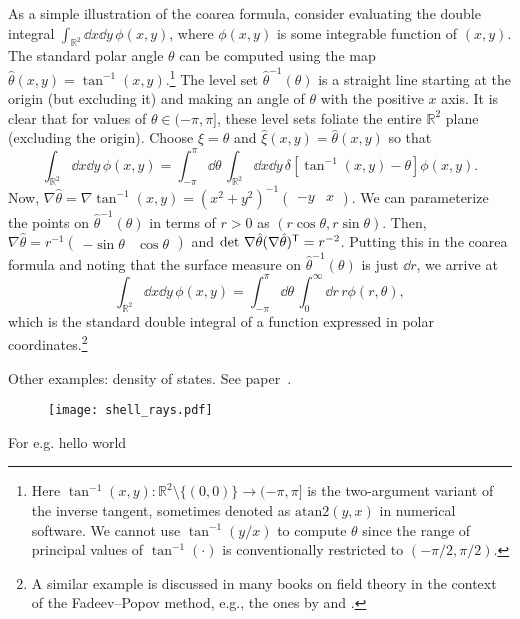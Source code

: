 \begin{example}
  As a simple illustration of the coarea formula, consider evaluating the double integral $\int_{\mathbb{R}^{2}} \dd{x}\dd{y}\, \phi(x,y)$, where $\phi(x, y)$ is some integrable function of $(x, y)$.
  The standard polar angle $\theta$ can be computed using the map $\hat{\theta}(x, y) = \tan^{-1}(x, y)$.\footnote{Here $\tan^{-1}(x, y): \mathbb{R}^{2} \setminus \{(0,0)\} \to (-\pi, \pi]$ is the two-argument variant of the inverse tangent, sometimes denoted as $\mathrm{atan2}(y, x)$ in numerical software.  We cannot use $\tan^{-1}(y/x)$ to compute $\theta$ since the range of principal values of $\tan^{-1}(\cdot)$ is conventionally restricted to $(-\pi/2, \pi/2)$.}
  The level set $\hat{\theta}^{-1}(\theta)$ is a straight line starting at the origin (but excluding it) and making an angle of $\theta$ with the positive $x$ axis.
  It is clear that for values of $\theta \in (-\pi, \pi]$, these level sets foliate the entire $\mathbb{R}^{2}$ plane (excluding the origin).
  Choose $\xi = \theta$ and $\hat{\xi}(x, y) = \hat{\theta}(x, y)$ so that
  \begin{equation}
    \int_{\mathbb{R}^{2}} \dd{x}\dd{y}\, \phi(x, y) = \int_{-\pi}^{\pi} \dd\theta\, \int_{\mathbb{R}^{2}} \dd{x}\dd{y}\, \delta[\tan^{-1}(x, y) - \theta] \phi(x, y).
  \end{equation}
  Now, $\nabla\hat{\theta} = \nabla\tan^{-1}(x, y) = (x^{2} + y^{2})^{-1}\begin{pmatrix}-y & x\end{pmatrix}$.
  We can parameterize the points on $\hat{\theta}^{-1}(\theta)$ in terms of $r > 0$ as $(r\cos{\theta}, r\sin{\theta})$.
  Then, $\nabla\hat{\theta} = r^{-1}\begin{pmatrix}-\sin\theta & \cos\theta\end{pmatrix}$ and $\det\,\nabla\hat{\theta}(\nabla\hat{\theta})^\mathsf{T} = r^{-2}$.
  Putting this in the coarea formula and noting that the surface measure on $\hat{\theta}^{-1}(\theta)$ is just $\dd{r}$, we arrive at
  \begin{equation}
    \int_{\mathbb{R}^{2}} \dd{x}\dd{y}\, \phi(x, y) = \int_{-\pi}^{\pi} \dd\theta\, \int_0^{\infty} \dd{r}\, r \phi(r, \theta),
  \end{equation}
  which is the standard double integral of a function expressed in polar coordinates.\footnote{A similar example is discussed in many books on field theory in the context of the Fadeev--Popov method, e.g., the ones by \citet[Section 7.2]{ryder1996} and \citet[Part III.4]{zee2010}.}
  \altqed
\end{example}

Other examples: density of states.  See paper~\cite{gillespie1983}.


\begin{figure}
  \begin{center}
    \texttt{[image: shell\_rays.pdf]}
  \end{center}
\end{figure}

For e.g. hello world

\printpagenotes
